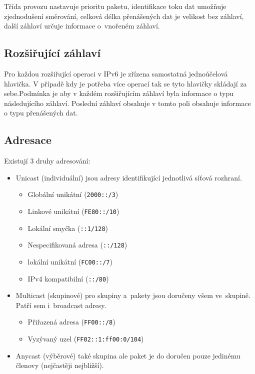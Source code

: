 Třída provozu nastavuje prioritu paketu, identifikace toku dat umožňuje zjednodušení směrování, celková délka přenášených dat je velikost bez záhlaví, další záhlaví určuje informace o~vnořeném záhlaví.

\subsection{Rozšiřující záhlaví}

Pro každou rozšiřující operaci v IPv6 je zřízena samostatná jednoúčelová hlavička.
V případě kdy je potřeba více operací tak se tyto hlavičky skládají za sebe.Podmínka je aby v každém rozšiřujícím záhlaví byla informace o typu následujícího záhlaví.
Poslední záhlaví obsahuje v tomto poli obsahuje informace o typu přenášených dat.

\subsection{Adresace}

Existují 3 druhy adresování:
\begin{itemize}[noitemsep]
    \item Unicast (individuální) jsou adresy identifikující jednotlivá síťová rozhraní.
    \begin{itemize}[noitemsep]
        \item Globální unikátní (\texttt{2000::/3})
        \item Linkové unikátní (\texttt{FE80::/10})
        \item Lokální smyčka (\texttt{::1/128})
        \item Nespecifikovaná adresa (\texttt{::/128})
        \item lokální unikátní (\texttt{FC00::/7})
        \item IPv4 kompatibilní (\texttt{::/80})
    \end{itemize}
    \item Multicast (skupinové) pro skupiny a~pakety jsou doručeny všem ve~skupině. Patří sem i~broadcast adresy.
    \begin{itemize}[noitemsep]
        \item Přiřazená adresa (\texttt{FF00::/8})
        \item Vyzývaný uzel (\texttt{FF02::1:ff00:0/104})
    \end{itemize}
    \item Anycast (výběrové) také skupina ale paket je do doručen pouze jedinému členovy (nejčastěji nejbližší).
\end{itemize}

